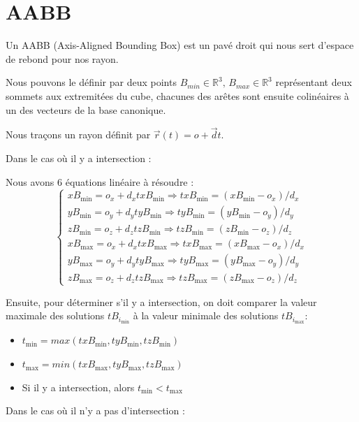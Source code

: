 \section{AABB}

Un AABB (Axis-Aligned Bounding Box) est un pavé droit qui nous sert d'espace de rebond pour nos rayon.

Nous pouvons le définir par deux points $B_{min} \in \mathbb{R}^3, \, B_{max} \in \mathbb{R}^3$ représentant deux sommets aux extremitées du cube, chacunes des arêtes sont ensuite colinéaires à un des vecteurs de la base canonique.

\cubeblank

Nous traçons un rayon définit par $\vec{r}(t) = o + \vec{d}t$.

Dans le cas où il y a intersection :

\intersection

Nous avons 6 équations linéaire à résoudre :
$$
\begin{cases}
    xB_{\min} = o_{x} + d_{x}txB_{\min} \Longrightarrow txB_{\min} =  (xB_{\min} - o_{x})/d_{x} \\
    yB_{\min} = o_{y} + d_{y}tyB_{\min} \Longrightarrow tyB_{\min} =  (yB_{\min} - o_{y})/d_{y} \\
    zB_{\min} = o_{z} + d_{z}tzB_{\min} \Longrightarrow tzB_{\min} =  (zB_{\min} - o_{z})/d_{z} \\
    xB_{\max} = o_{x} + d_{x}txB_{\max} \Longrightarrow txB_{\max} =  (xB_{\max} - o_{x})/d_{x} \\
    yB_{\max} = o_{y} + d_{y}tyB_{\max} \Longrightarrow tyB_{\max} =  (yB_{\max} - o_{y})/d_{y} \\
    zB_{\max} = o_{z} + d_{z}tzB_{\max} \Longrightarrow tzB_{\max} =  (zB_{\max} - o_{z})/d_{z}
\end{cases}
$$

Ensuite, pour déterminer s'il y a intersection, on doit comparer la valeur maximale des solutions $tB_{i_\text{min}}$ à la valeur minimale des solutions $tB_{i_\text{max}}$:
\begin{itemize}
    \item $t_{\min} = max(txB_{\min}, tyB_{\min}, tzB_{\min})$
    \item $t_{\max} = min(txB_{\max}, tyB_{\max}, tzB_{\max})$
    \item Si il y a intersection, alors $t_{\min} < t_{\max}$
\end{itemize}

Dans le cas où il n'y a pas d'intersection :

